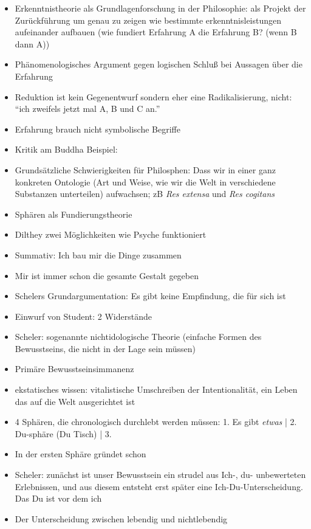 \documentclass[emulatestandardclasses]{scrartcl}
\begin{document}
\begin{itemize}
  \item Erkenntnistheorie als Grundlagenforschung in der Philosophie: als Projekt der Zurückführung um genau zu zeigen wie bestimmte erkenntnisleistungen aufeinander aufbauen (wie fundiert Erfahrung A die Erfahrung B? (wenn B dann A))
  \item Phänomenologisches Argument gegen logischen Schluß bei Aussagen über die Erfahrung
  \item Reduktion ist kein Gegenentwurf sondern eher eine Radikalisierung, nicht: "`ich zweifels jetzt mal A, B und C an."'
  \item Erfahrung brauch nicht symbolische Begriffe
  \item Kritik am Buddha Beispiel: 
  \item Grundsätzliche Schwierigkeiten für Philosphen: Dass wir in einer ganz konkreten Ontologie (Art und Weise, wie wir die Welt in verschiedene Substanzen unterteilen) aufwachsen; zB \emph{Res extensa} und \emph{Res cogitans}
\end{itemize}

\begin{itemize}
  \item Sphären als Fundierungstheorie
  \item Dilthey zwei Möglichkeiten wie Psyche funktioniert
  \item Summativ: Ich bau mir die Dinge zusammen
  \item Mir ist immer schon die gesamte Gestalt gegeben
  \item Schelers Grundargumentation: Es gibt keine Empfindung, die für sich ist
  \item Einwurf von Student: 2 Widerstände
  \item Scheler: sogenannte nichtidologische Theorie (einfache Formen des Bewusstseins, die nicht in der Lage sein müssen)
  \item Primäre Bewusstseinsimmanenz
  \item ekstatisches wissen: vitalistische Umschreiben der Intentionalität, ein Leben das auf die Welt ausgerichtet ist
  \item 4 Sphären, die chronologisch durchlebt werden müssen: 1. Es gibt \emph{etwas} | 2. Du-sphäre (Du Tisch) | 3. 
  \item In der ersten Sphäre gründet schon 
  \item Scheler: zunächst ist unser Bewusstsein ein strudel aus Ich-, du- unbewerteten Erlebnissen, und aus diesem entsteht erst später eine Ich-Du-Unterscheidung. Das Du ist vor dem ich
  \item Der Unterscheidung zwischen lebendig und nichtlebendig 
\end{itemize}
\end{document}

